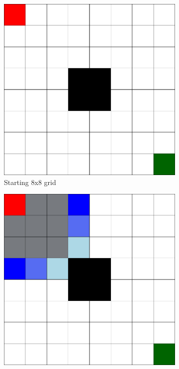 \begin{figure}[h!]
  \centering
  \begin{subfigure}[b]{0.2\linewidth}
    \includegraphics[width=\linewidth]{images/simple_grid.png}
     \caption{Starting 8x8 grid}
  \end{subfigure}
  \hfill
  \begin{subfigure}[b]{0.2\linewidth}
    \includegraphics[width=\linewidth]{images/dijkstra1.png}

\end{subfigure}
\end{figure}
